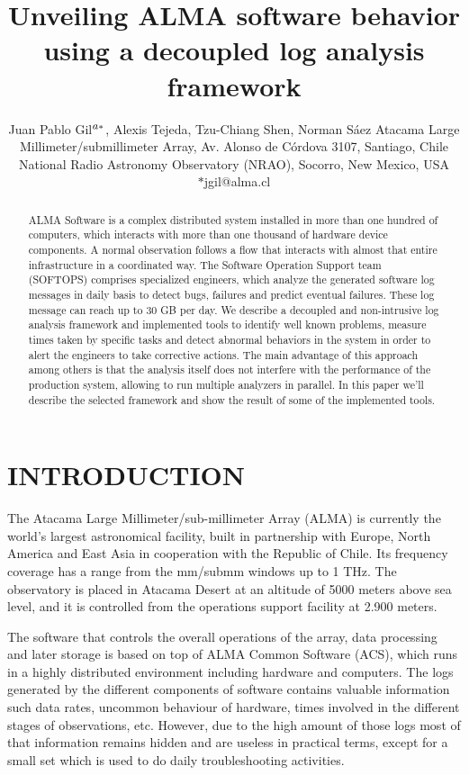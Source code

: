 \documentclass[]{spie}  %
\title{Unveiling ALMA software behavior using a decoupled log analysis framework}
\author{Juan Pablo Gil$\supit{a}^{*}$, Alexis Tejeda\supit{b}, Tzu-Chiang Shen\supit{a}, Norman S\'aez\supit{a}
\skiplinehalf
\supit{a}Atacama Large Millimeter/submillimeter Array, Av. Alonso de C\'ordova 3107, Santiago, Chile\\
\supit{b}National Radio Astronomy Observatory (NRAO), Socorro, New Mexico, USA\\ $*$jgil@alma.cl
}
\begin{document}
 
  \maketitle 

\begin{abstract}
ALMA Software is a complex distributed system installed in more than one
hundred of computers, which interacts with more than one thousand of hardware
device components. A normal observation follows a flow that interacts with
almost that entire infrastructure in a coordinated way. The Software Operation
Support team (SOFTOPS) comprises specialized engineers, which analyze the generated
software log messages in daily basis to detect bugs, failures and predict
eventual failures. These log message can reach up to 30 GB per day. We describe
a decoupled and non-intrusive log analysis framework and implemented tools to
identify well known problems, measure times taken by specific tasks and detect
abnormal behaviors in the system in order to alert the engineers to take
corrective actions. The main advantage of this approach among others is that
the analysis itself does not interfere with the performance of the production
system, allowing to run multiple analyzers in parallel. In this paper we'll
describe the selected framework and show the result of some of the implemented
tools.
\end{abstract}



\section{INTRODUCTION}\label{sec:intro}  %
The Atacama Large Millimeter/sub-millimeter Array (ALMA) is currently the
world's largest astronomical facility, built in partnership with Europe,
    North America and East Asia in cooperation with the Republic of Chile. Its
    frequency coverage has a range from the mm/submm windows up to 1 THz. The
    observatory is placed in Atacama Desert at an altitude of 5000 meters above
    sea level, and it is controlled from the operations support facility at
    2.900 meters.

The software that controls the overall operations of the array, data processing
and later storage is based on top of ALMA Common Software (ACS), which runs in
a highly distributed environment including hardware and computers. The logs
generated by the different components of software contains valuable information
such data rates, uncommon behaviour of hardware, times involved in the
different stages of observations, etc. However, due to the high amount of those
logs most of that information remains hidden and are useless in practical terms,
except for a small set which is used to do daily troubleshooting activities.
\end{document}
